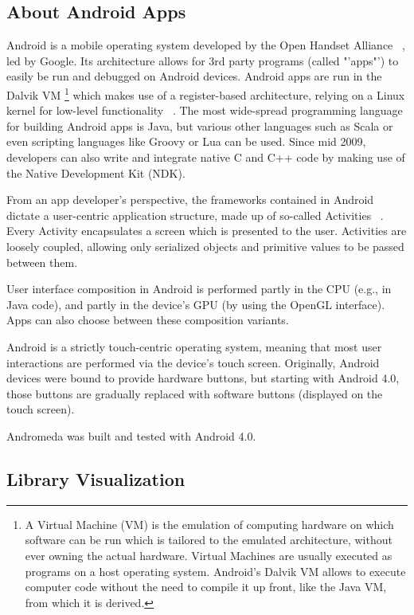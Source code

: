 \subsection{About Android Apps}

Android is a mobile operating system developed by the Open Handset Alliance ~\cite{url:openhandsetalliance}, led by Google. Its architecture allows for 3rd party programs (called "'apps"') to easily be run and debugged on Android devices.
Android apps are run in the Dalvik VM \footnote{A Virtual Machine (VM) is the emulation of computing hardware on which software can be run which is tailored to the emulated architecture, without ever owning the actual hardware. Virtual Machines are usually executed as programs on a host operating system. Android's Dalvik VM allows to execute computer code without the need to compile it up front, like the Java VM, from which it is derived.} which makes use of a register-based architecture, relying on a Linux kernel for low-level functionality ~\cite{dalvik}. The most wide-spread programming language for building Android apps is Java, but various other languages such as Scala or even scripting languages like Groovy or Lua can be used. Since mid 2009, developers can also write and integrate native C and C++ code by making use of the Native Development Kit (NDK).

From an app developer's perspective, the frameworks contained in Android dictate a user-centric application structure, made up of so-called Activities ~\cite{url:androidactivity}. Every Activity encapsulates a screen which is presented to the user. Activities are loosely coupled, allowing only serialized objects and primitive values to be passed between them.

User interface composition in Android is performed partly in the CPU (e.g., in Java code), and partly in the device's GPU (by using the OpenGL interface). Apps can also choose between these composition variants.

Android is a strictly touch-centric operating system, meaning that most user interactions are performed via the device's touch screen. Originally, Android devices were bound to provide hardware buttons, but starting with Android 4.0, those buttons are gradually replaced with software buttons (displayed on the touch screen).

Andromeda was built and tested with Android 4.0.

\subsection{Library Visualization}
\label{subsec:libraryvis}

